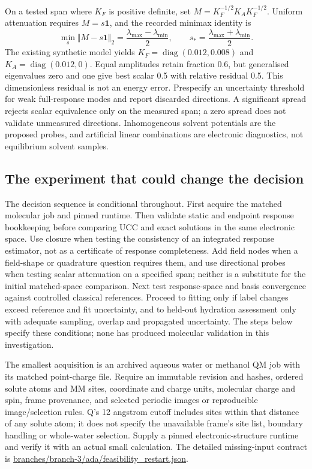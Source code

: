 \documentclass{article}
\begin{document}
On a tested span where $K_F$ is positive definite, set $M=K_F^{-1/2}K_AK_F^{-1/2}$. Uniform attenuation requires $M=s\mathbf{1}$, and the recorded minimax identity is
\begin{equation*}
\min_s\Vert M-s\mathbf{1}\Vert_2
=\frac{\lambda_{\max}-\lambda_{\min}}{2},\qquad
s_*=\frac{\lambda_{\max}+\lambda_{\min}}{2}.
\end{equation*}
The existing synthetic model yields $K_F=\operatorname{diag}(0.012,0.008)$ and $K_A=\operatorname{diag}(0.012,0)$. Equal amplitudes retain fraction 0.6, but generalised eigenvalues zero and one give best scalar 0.5 with relative residual 0.5. This dimensionless residual is not an energy error. Prespecify an uncertainty threshold for weak full-response modes and report discarded directions. A significant spread rejects scalar equivalence only on the measured span; a zero spread does not validate unmeasured directions. Inhomogeneous solvent potentials are the proposed probes, and artificial linear combinations are electronic diagnostics, not equilibrium solvent samples.

\subsection{The experiment that could change the decision}

The decision sequence is conditional throughout. First acquire the matched molecular job and pinned runtime. Then validate static and endpoint response bookkeeping before comparing UCC and exact solutions in the same electronic space. Use closure when testing the consistency of an integrated response estimator, not as a certificate of response completeness. Add field nodes when a field-shape or quadrature question requires them, and use directional probes when testing scalar attenuation on a specified span; neither is a substitute for the initial matched-space comparison. Next test response-space and basis convergence against controlled classical references. Proceed to fitting only if label changes exceed reference and fit uncertainty, and to held-out hydration assessment only with adequate sampling, overlap and propagated uncertainty. The steps below specify these conditions; none has produced molecular validation in this investigation.

The smallest acquisition is an archived aqueous water or methanol QM job with its matched point-charge file. Require an immutable revision and hashes, ordered solute atoms and MM sites, coordinate and charge units, molecular charge and spin, frame provenance, and selected periodic images or reproducible image/selection rules. Q's 12 angstrom cutoff includes sites within that distance of any solute atom; it does not specify the unavailable frame's site list, boundary handling or whole-water selection. Supply a pinned electronic-structure runtime and verify it with an actual small calculation. The detailed missing-input contract is \url{branches/branch-3/ada/feasibility_restart.json}.
\end{document}
